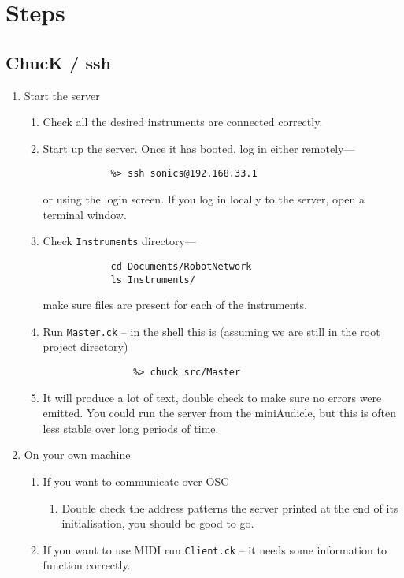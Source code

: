 \documentclass[11pt]{article}
\begin{document}
\section{Steps}

\subsection{ChucK / ssh}
\begin{enumerate} [\bf 1.]
\item {\large Start the server}
	\begin{enumerate} [\bf i.]

		\item{Check all the desired instruments are connected correctly.}
		\item{Start up the server. Once it has booted, log in either remotely---
		\begin{verbatim}
			%> ssh sonics@192.168.33.1
		\end{verbatim}
		or using the login screen. If you log in locally to the server, open a terminal window.}
		\item{Check \texttt{Instruments} directory---
		\begin{verbatim}
			cd Documents/RobotNetwork 
			ls Instruments/
		\end{verbatim}
		make sure files are present for each of the instruments.}
		\item Run \texttt{Master.ck} -- in the shell this is (assuming we are still in the root project directory)
		\begin{verbatim}
			    %> chuck src/Master
		\end{verbatim}
		\item  It will produce a lot of text, double check to make sure no errors were emitted. You could run the 
			  server from the miniAudicle, but this is often less stable over long periods of time.
	\end{enumerate}
\item {\large On your own machine}
	\begin{enumerate} [\bf i.]
		\item {If you want to communicate over OSC}
		\begin{enumerate} [\bf a.]
			\item{Double check the address patterns the server printed at the end of its initialisation, you should be good to go.}
		\end{enumerate}
		\item {If you want to use MIDI run \texttt{Client.ck} -- it needs some information to function correctly.
}
\end{enumerate}
\end{enumerate}
\end{document}
